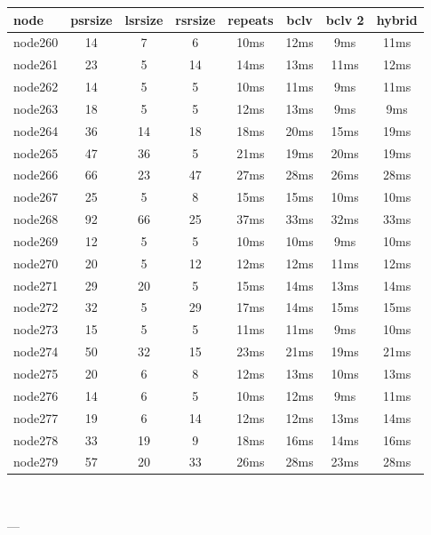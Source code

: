 \begin{tabular}{|l|c|c|c|c|c|c|c|}
\hline node & psrsize & lsrsize & rsrsize   & repeats & bclv & bclv 2 & hybrid\\
    \hline node260 & 14 & 7 & 6 & 10ms & 12ms & 9ms & 11ms\\
    \hline node261 & 23 & 5 & 14 & 14ms & 13ms & 11ms & 12ms\\
    \hline node262 & 14 & 5 & 5 & 10ms & 11ms & 9ms & 11ms\\
    \hline node263 & 18 & 5 & 5 & 12ms & 13ms & 9ms & 9ms\\
    \hline node264 & 36 & 14 & 18 & 18ms & 20ms & 15ms & 19ms\\
    \hline node265 & 47 & 36 & 5 & 21ms & 19ms & 20ms & 19ms\\
    \hline node266 & 66 & 23 & 47 & 27ms & 28ms & 26ms & 28ms\\
    \hline node267 & 25 & 5 & 8 & 15ms & 15ms & 10ms & 10ms\\
    \hline node268 & 92 & 66 & 25 & 37ms & 33ms & 32ms & 33ms\\
    \hline node269 & 12 & 5 & 5 & 10ms & 10ms & 9ms & 10ms\\
    \hline node270 & 20 & 5 & 12 & 12ms & 12ms & 11ms & 12ms\\
    \hline node271 & 29 & 20 & 5 & 15ms & 14ms & 13ms & 14ms\\
    \hline node272 & 32 & 5 & 29 & 17ms & 14ms & 15ms & 15ms\\
    \hline node273 & 15 & 5 & 5 & 11ms & 11ms & 9ms & 10ms\\
    \hline node274 & 50 & 32 & 15 & 23ms & 21ms & 19ms & 21ms\\
    \hline node275 & 20 & 6 & 8 & 12ms & 13ms & 10ms & 13ms\\
    \hline node276 & 14 & 6 & 5 & 10ms & 12ms & 9ms & 11ms\\
    \hline node277 & 19 & 6 & 14 & 12ms & 12ms & 13ms & 14ms\\
    \hline node278 & 33 & 19 & 9 & 18ms & 16ms & 14ms & 16ms\\
    \hline node279 & 57 & 20 & 33 & 26ms & 28ms & 23ms & 28ms\\

\hline
\end{tabular} \

---


